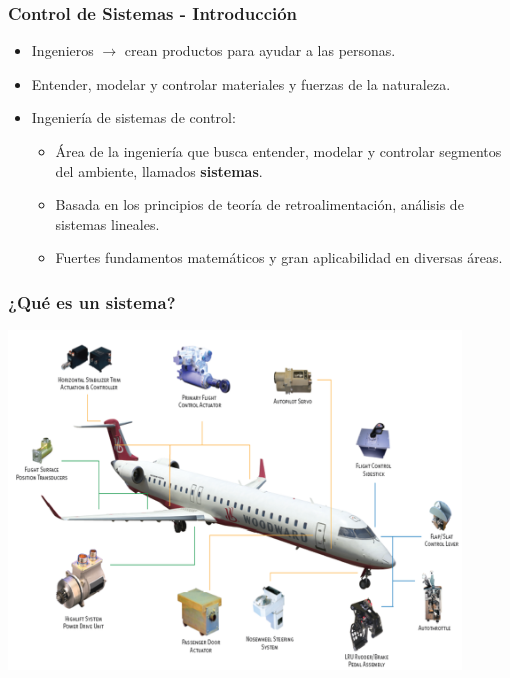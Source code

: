 \documentclass[aspectratio=169,handout]{beamer}
\theoremstyle{definition}
\theoremstyle{plain}
\theoremstyle{remark}
\begin{document}
\begin{frame}[<+->][c]\frametitle{Control de Sistemas - Introducción}
\begin{itemize}
  \item Ingenieros $\rightarrow$ crean productos para ayudar a las personas.
  \item Entender, modelar y controlar materiales y fuerzas de la naturaleza.
  \item Ingeniería de sistemas de control:
  \begin{itemize}
    \item Área de la ingeniería que busca entender, modelar y controlar segmentos del ambiente, llamados \textbf{sistemas}.
    \item Basada en los principios de teoría de retroalimentación, análisis de sistemas lineales.
    \item Fuertes fundamentos matemáticos y gran aplicabilidad en diversas áreas.
  \end{itemize}
\end{itemize}
\end{frame}

\begin{frame}[<+->][c]\frametitle{¿Qué es un sistema?}
\begin{center}
  \includegraphics[width=12cm]{images/planeSystem.png}
\end{center}  
\end{frame}
\end{document}
